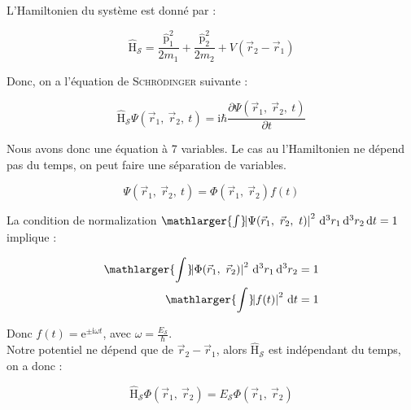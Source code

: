 \documentclass[12pt,a4paper,oneside,french]{book}
\renewcommand{\i}{\mathrm{i}}
\newcommand{\e}{\mathrm{e}}
\newcommand{\opr}[1]{\mathrm{\hat{#1}}}
\newcommand{\diff}{\mathrm{d}}
\newcommand{\bigint}[2]{\mathop{\mathlarger{\int_{#1}^{#2}}}}
\theoremstyle{definition}
\theoremstyle{definition}
\theoremstyle{definition}
\theoremstyle{remark}
\theoremstyle{definition}
\begin{document}
    L'Hamiltonien du système est donné par :
    
    \begin{equation*}
        {\opr{H}}_{\mathcal{S}} = \frac{{\opr{p}}_{1}^{2}}{2 {m}_{1}} + \frac{{\opr{p}}_{2}^{2}}{2 {m}_{2}} + V({\vec{r}}_{2} - {\vec{r}}_{1})
    \end{equation*}
    
    Donc, on a l'équation de \textsc{Schrödinger} suivante :
    
    \begin{equation*}
        {\opr{H}}_{\mathcal{S}} \Psi({\vec{r}}_{1}, \ {\vec{r}}_{2}, \ t) = \i \hbar \frac{\partial \Psi({\vec{r}}_{1}, \ {\vec{r}}_{2}, \ t)}{\partial t}
    \end{equation*}
    
    Nous avons donc une équation à 7 variables. Le cas au l'Hamiltonien ne dépend pas du temps, on peut faire une séparation de variables.
    
    \begin{equation*}
        \Psi({\vec{r}}_{1}, \ {\vec{r}}_{2}, \ t) = \Phi({\vec{r}}_{1}, \ {\vec{r}}_{2}) f(t)
    \end{equation*}
    
    La condition de normalization $\bigint{}{} \!\! {\left\lvert\Psi({\vec{r}}_{1}, \ {\vec{r}}_{2}, \ t)\right\rvert}^{2} \ {\diff}^{3} {r}_{1} \, {\diff}^{3} {r}_{2} \, \diff t = 1$ implique :
    
    \begin{align*}
    \begin{split}
        \bigint{}{} \!\! {\left\lvert\Phi({\vec{r}}_{1}, \ {\vec{r}}_{2})\right\rvert}^{2} \ {\diff}^{3} {r}_{1} \, {\diff}^{3} {r}_{2} &= 1 \\
        \bigint{}{} \!\! {\left\lvert{f}(t)\right\rvert}^{2} \ \diff t &= 1
    \end{split}
    \end{align*}
    
    Donc $f(t) = {\e}^{\pm \i \omega t}$, avec $\omega = \frac{{E}_{\mathcal{S}}}{\hbar}$. \\
    
    Notre potentiel ne dépend que de ${\vec{r}}_{2} - {\vec{r}}_{1}$, alors ${\opr{H}}_{\mathcal{S}}$ est indépendant du temps, on a donc :
    
    \begin{equation*}
        {\opr{H}}_{\mathcal{S}} \Phi({\vec{r}}_{1}, \ {\vec{r}}_{2}) = {E}_{\mathcal{S}} \Phi({\vec{r}}_{1}, \ {\vec{r}}_{2})
    \end{equation*}
    
\end{document}
